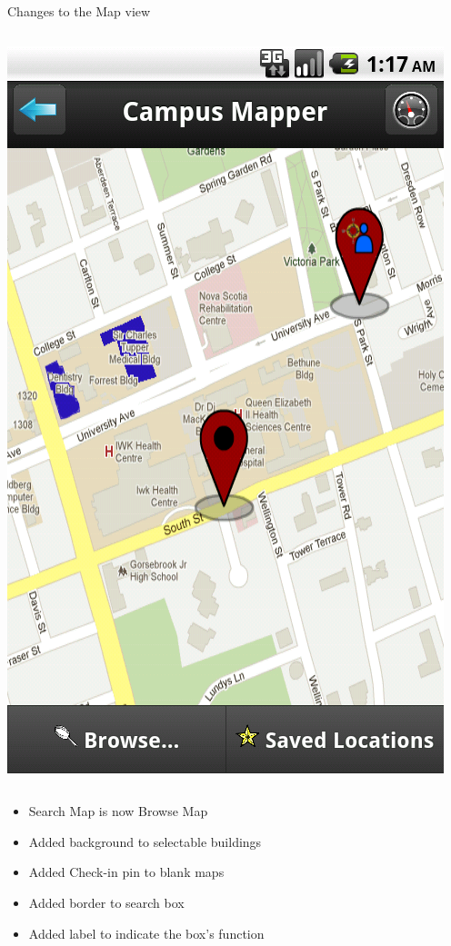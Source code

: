 \documentclass{beamer}
\begin{document}
\begin{frame}{Changes to the Map view}
\begin{columns}[c]
        \center\includegraphics[height=0.5 \textheight]{post-heuristic/map-blank.png}
    \end{columns}
    \begin{itemize}
        \item Search Map is now Browse Map
        \item Added background to selectable buildings
        \item Added Check-in pin to blank maps
        \item Added border to search box
        \item Added label to indicate the box's function
    \end{itemize}
\end{frame}
\end{document}
